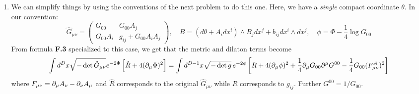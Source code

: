 \documentclass[11pt, class=article, crop=false]{standalone}
\begin{document}
\begin{enumerate}
	In doing this path integral we get a determinant factor of $\sqrt{4 \pi^2 \ell_s^2/R^2} = 2 \pi \ell_s/R$ for each mode. Using zeta function regularization this is equal to $\sqrt{R/2 \pi \ell_s}$ which we can understand as adding a $-\log(R/\ell_s)$ term to the action that will couple to the curvature $R$ \textbf{(Show why)}, this shifting the dilaton as required.
	
	\item We can simplify things by using the conventions of the next problem to do this one. Here, we have a \emph{single} compact coordinate $\theta$. In our convention:
	\[
		\hat G_{\mu \nu} = \begin{pmatrix}
			G_{00} & G_{00} A_j\\
			G_{00} A_i & g_{ij} + G_{00} A_i A_j
		\end{pmatrix}, \quad B = (d\theta + A_i dx^i) \wedge B_j dx^j + b_{ij} dx^i \wedge dx^j, \quad \phi = \Phi - \frac14 \log G_{00}
	\]
	 From formula \textbf{F.3} specialized to this case, we get that the metric and dilaton terms become
	\begin{equation}\label{eq:gdil}
		\int d^D x \sqrt{-\det \hat G_{\mu \nu}} e^{-2 \Phi} \left[\hat R + 4 (\partial_\mu \Phi)^2 \right] = \int d^{D-1}x \sqrt{-\det g}\, e^{-2 \phi} \left[R + 4 (\partial_\mu \phi)^2 + \frac14 \partial_\mu G_{00} \partial^\mu G^{00} - \frac14 G_{00} (F^A_{\mu \nu})^2\right]
	\end{equation}
	where $F_{\mu \nu} = \partial_\mu A_\nu - \partial_\nu A_\mu$ and $\hat R$ corresponds to the original $\hat G_{\mu \nu}$ while $R$ corresponds to $g_{ij}$. Further $G^{00} = 1/G_{00}$.
	

\end{enumerate}
\end{document}
